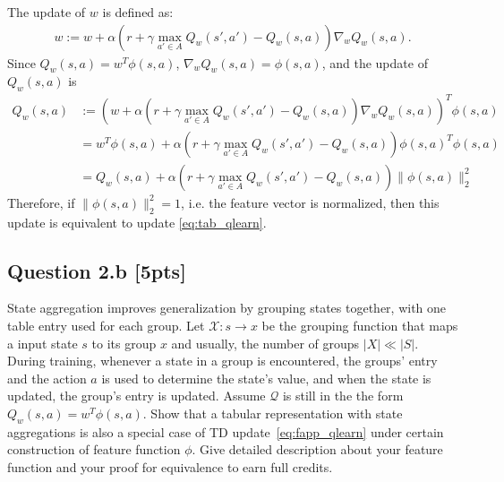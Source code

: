 \documentclass[12pt]{article}
\begin{document}
\noindent
\begin{solution}
The update of $w$ is defined as:
\begin{align*}
    w := w + 
        \alpha \left( 
            r + \gamma \max _{a' \in A} Q _w(s', a') 
                - Q _w(s, a) 
        \right) \nabla _w 
            Q _w (s, a) .
\end{align*}
Since $Q _w(s, a) = w ^T \phi(s, a)$, $\nabla _w Q _w (s, a)=\phi(s,a)$, and the update of $Q_w(s,a)$ is
\begin{align*}
    Q _w(s, a) &:= \left(w + 
        \alpha \left( 
            r + \gamma \max _{a' \in A} Q _w(s', a') 
                - Q _w(s, a) 
        \right) \nabla _w 
            Q _w (s, a)\right)^T\phi(s, a)\\
    &=w^T\phi(s,a)+\alpha \left( r + \gamma \max _{a' \in A} Q _w(s', a') - Q _w(s, a) \right)\phi(s,a)^T\phi(s,a)\\
    &=Q _w(s, a)+\alpha \left( r + \gamma \max _{a' \in A} Q _w(s', a') - Q _w(s, a) \right)\|\phi(s,a)\|^2_2
\end{align*}
Therefore, if $\|\phi(s,a)\|^2_2=1$, i.e. the feature vector is normalized, then this update is equivalent to update \ref{eq:tab_qlearn}.
\end{solution}

\subsection*{Question 2.b \textbf{[5pts]}}
State aggregation improves generalization by grouping states together, with one table entry used for each group. Let $\mathcal{X}: s \to x$ be the grouping function that maps a input state $s$ to its group $x$ and usually, the number of groups $|X| \ll |S|$. During training, whenever a state in a group is encountered, the groups' entry and the action $a$ is used to determine the state's value, and when the state is updated, the group's entry is updated. Assume $\mathcal Q$ is still in the the form $Q _w(s, a) = w ^T \phi(s, a)$. Show that a tabular representation with state aggregations is also a special case of TD update~\ref{eq:fapp_qlearn} under certain construction of feature function $\phi$. Give detailed description about your feature function and your proof for equivalence to earn full credits. 

\noindent

\begin{solution}
\end{solution}
\end{document}
